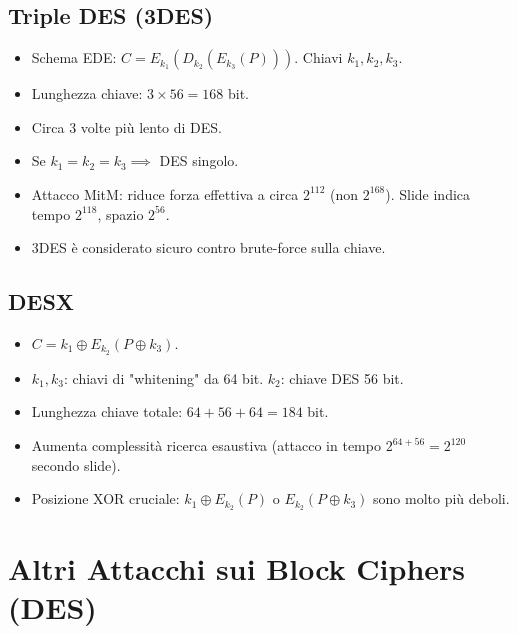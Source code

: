 \subsection{Triple DES (3DES)}
\begin{itemize}
    \item Schema EDE: $C = E_{k_1}(D_{k_2}(E_{k_3}(P)))$. Chiavi $k_1, k_2, k_3$.
    \item Lunghezza chiave: $3 \times 56 = 168$ bit.
    \item Circa 3 volte più lento di DES.
    \item Se $k_1 = k_2 = k_3 \implies$ DES singolo.
    \item Attacco MitM: riduce forza effettiva a circa $2^{112}$ (non $2^{168}$). Slide indica tempo $2^{118}$, spazio $2^{56}$.
    \item 3DES è considerato sicuro contro brute-force sulla chiave.
\end{itemize}

\subsection{DESX}
\begin{itemize}
    \item $C = k_1 \oplus E_{k_2}(P \oplus k_3)$.
    \item $k_1, k_3$: chiavi di "whitening" da 64 bit. $k_2$: chiave DES 56 bit.
    \item Lunghezza chiave totale: $64+56+64 = 184$ bit.
    \item Aumenta complessità ricerca esaustiva (attacco in tempo $2^{64+56} = 2^{120}$ secondo slide).
    \item Posizione XOR cruciale: $k_1 \oplus E_{k_2}(P)$ o $E_{k_2}(P \oplus k_3)$ sono molto più deboli.
\end{itemize}

\section{Altri Attacchi sui Block Ciphers (DES)}

